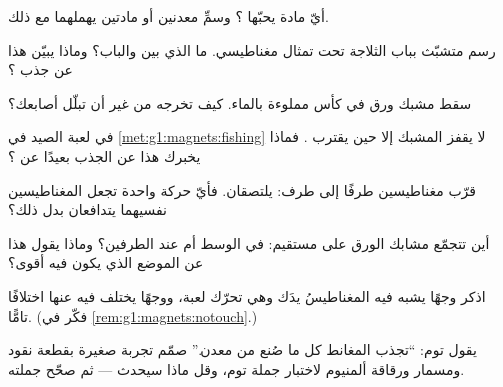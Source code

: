 \begin{exercise}[$\star$]\label{exo:g1:magnets:2}
أيّ مادة يحبّها ؟ وسمِّ معدنين أو مادتين يهملهما
 مع ذلك.
\end{exercise}

\begin{exercise}[$\star$]\label{exo:g1:magnets:3}
رسم متشبّث بباب الثلاجة تحت تمثال مغناطيسي. ما الذي بين 
والباب؟ وماذا يبيّن هذا عن جذب ؟
\end{exercise}

\begin{exercise}[$\star$]\label{exo:g1:magnets:4}
سقط مشبك ورق في كأس مملوءة بالماء. كيف تخرجه  من غير أن
تبلّل أصابعك؟
\end{exercise}

\begin{exercise}[$\star$]\label{exo:g1:magnets:5}
في لعبة الصيد  في \cref{met:g1:magnets:fishing} لا يقفز
المشبك إلا حين يقترب . فماذا يخبرك هذا عن الجذب بعيدًا
عن ؟
\end{exercise}

\begin{exercise}[$\star$]\label{exo:g1:magnets:6}
قرّب مغناطيسين طرفًا إلى طرف: يلتصقان. فأيّ حركة واحدة تجعل
المغناطيسين نفسيهما يتدافعان بدل ذلك؟
\end{exercise}

\begin{exercise}[$\star$]\label{exo:g1:magnets:7}
أين تتجمّع مشابك الورق على  مستقيم: في الوسط أم عند
الطرفين؟ وماذا يقول هذا عن الموضع الذي يكون فيه  أقوى؟
\end{exercise}

\begin{exercise}[$\star$]\label{exo:g1:magnets:8}
اذكر وجهًا يشبه فيه المغناطيسُ يدَك وهي تحرّك لعبة، ووجهًا يختلف
فيه عنها اختلافًا تامًّا. (فكّر في
\cref{rem:g1:magnets:notouch}.)
\end{exercise}

\begin{exercise}[$\star\star$]\label{exo:g1:magnets:9}
يقول توم: ``تجذب المغانط كل ما صُنع من معدن.'' صمّم تجربة صغيرة
بقطعة نقود ومسمار ورقاقة ألمنيوم لاختبار جملة توم، وقل ماذا
سيحدث --- ثم صحّح جملته.
\end{exercise}
